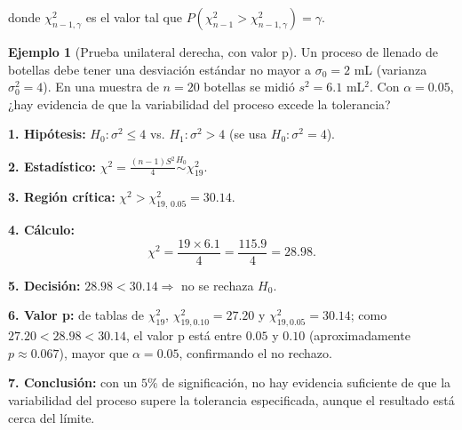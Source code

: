 \documentclass[11pt,a4paper]{article}
\theoremstyle{plain}
\theoremstyle{definition}
\newtheorem{ejemplo}[teorema]{Ejemplo}
\theoremstyle{remark}
\begin{document}
\noindent donde $\chi^2_{n-1,\gamma}$ es el valor tal que $P(\chi^2_{n-1}>\chi^2_{n-1,\gamma})=\gamma$.

\begin{center}
\end{center}

\begin{ejemplo}[Prueba unilateral derecha, con valor p]
Un proceso de llenado de botellas debe tener una desviación estándar no mayor a $\sigma_0=2$ mL (varianza $\sigma_0^2=4$). En una muestra de $n=20$ botellas se midió $s^2=6.1$ mL$^2$. Con $\alpha=0.05$, ¿hay evidencia de que la variabilidad del proceso excede la tolerancia?

\textbf{1. Hipótesis:} $H_0:\sigma^2\le4$ vs. $H_1:\sigma^2>4$ (se usa $H_0:\sigma^2=4$).

\textbf{2. Estadístico:} $\displaystyle \chi^2=\frac{(n-1)S^2}{4}\overset{H_0}{\sim}\chi^2_{19}$.

\textbf{3. Región crítica:} $\chi^2>\chi^2_{19,\,0.05}=30.14$.

\textbf{4. Cálculo:}
\[
\chi^2=\frac{19\times6.1}{4}=\frac{115.9}{4}=28.98.
\]

\textbf{5. Decisión:} $28.98<30.14\Rightarrow$ no se rechaza $H_0$.

\textbf{6. Valor p:} de tablas de $\chi^2_{19}$, $\chi^2_{19,0.10}=27.20$ y $\chi^2_{19,0.05}=30.14$; como $27.20<28.98<30.14$, el valor p está entre $0.05$ y $0.10$ (aproximadamente $p\approx0.067$), mayor que $\alpha=0.05$, confirmando el no rechazo.

\textbf{7. Conclusión:} con un $5\%$ de significación, no hay evidencia suficiente de que la variabilidad del proceso supere la tolerancia especificada, aunque el resultado está cerca del límite.
\end{ejemplo}
\end{document}
